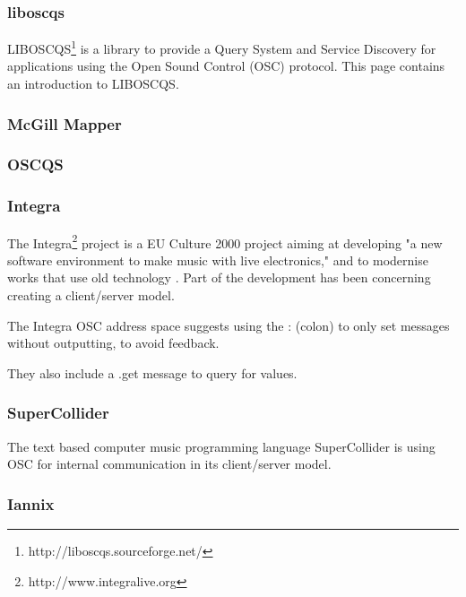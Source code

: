 \documentclass{sig-alternate}
\begin{document}
\subsubsection{liboscqs}

LIBOSCQS\footnote{http://liboscqs.sourceforge.net/} is a library to provide a Query System and Service Discovery for applications using the Open Sound Control (OSC) protocol\cite{Schmeder:2004oscqs}. This page contains an introduction to LIBOSCQS.


\subsubsection{McGill Mapper}

\cite{Malloch:2007}


\subsubsection{OSCQS}

\cite{Habets:2005}

\subsubsection{Integra}

The Integra\footnote{http://www.integralive.org} project is a EU Culture 2000 project aiming at developing "a new software environment to make music with live electronics," and to modernise works that use old technology \cite{Bullock:2007}. Part of the development has been concerning creating a client/server model. 

The Integra OSC address space suggests using the : (colon) to only set messages without outputting, to avoid feedback. 

They also include a .get message to query for values. 


\subsubsection{SuperCollider}

The text based computer music programming language SuperCollider is using OSC for internal communication in its client/server model. 


\subsubsection{Iannix}
\end{document}

